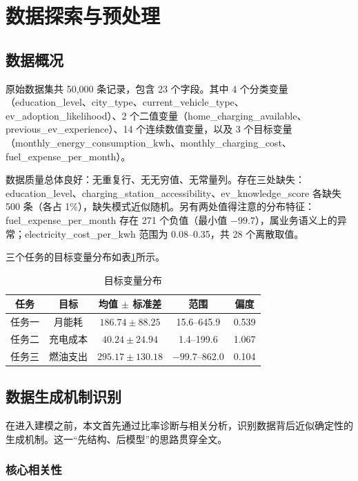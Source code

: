\section{数据探索与预处理}

\subsection{数据概况}

原始数据集共 50,000 条记录，包含 23 个字段。其中 4 个分类变量（education\_level、city\_type、current\_vehicle\_type、ev\_adoption\_likelihood）、2 个二值变量（home\_charging\_available、previous\_ev\_experience）、14 个连续数值变量，以及 3 个目标变量（monthly\_energy\_consumption\_kwh、monthly\_charging\_cost、fuel\_expense\_per\_month）。

数据质量总体良好：无重复行、无无穷值、无常量列。存在三处缺失：education\_level、charging\_station\_accessibility、ev\_knowledge\_score 各缺失 500 条（各占 1\%），缺失模式近似随机。另有两处值得注意的分布特征：fuel\_expense\_per\_month 存在 271 个负值（最小值 $-99.7$），属业务语义上的异常；electricity\_cost\_per\_kwh 范围为 0.08--0.35，共 28 个离散取值。

三个任务的目标变量分布如表\ref{tab:target_dist}所示。

\begin{table}[H]
\centering
\caption{目标变量分布}
\label{tab:target_dist}
\begin{tabular}{ccccc}
\toprule
\textbf{任务} & \textbf{目标} & \textbf{均值 $\pm$ 标准差} & \textbf{范围} & \textbf{偏度} \\
\midrule
任务一 & 月能耗 & $186.74 \pm 88.25$ & 15.6--645.9 & 0.539 \\
任务二 & 充电成本 & $40.24 \pm 24.94$ & 1.4--199.6 & 1.067 \\
任务三 & 燃油支出 & $295.17 \pm 130.18$ & $-99.7$--862.0 & 0.104 \\
\bottomrule
\end{tabular}
\end{table}

\subsection{数据生成机制识别}

在进入建模之前，本文首先通过比率诊断与相关分析，识别数据背后近似确定性的生成机制。这一``先结构、后模型''的思路贯穿全文。

\subsubsection{核心相关性}

